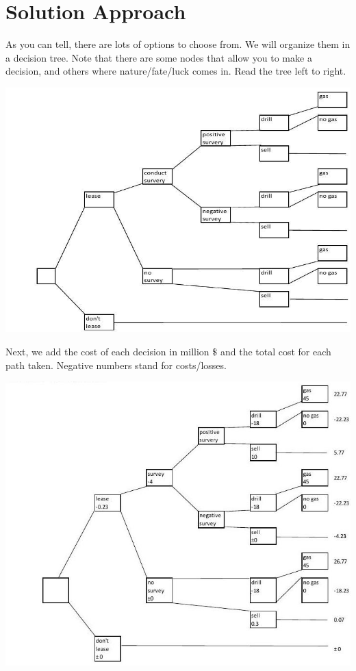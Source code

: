 \documentclass[10pt]{article}
\begin{document}
\section{Solution Approach}
As you can tell, there are lots of options to choose from. We will organize them in a decision tree. Note that there are some nodes that allow you to make a decision, and others where nature/fate/luck comes in. Read the tree left to right.

\includegraphics[max width=\textwidth]{2022_07_05_5945264bba2a5f6ba667g-62}

Next, we add the cost of each decision in million $\$$ and the total cost for each path taken. Negative numbers stand for costs/losses.

\includegraphics[max width=\textwidth]{2022_07_05_5945264bba2a5f6ba667g-62(1)}
\end{document}
